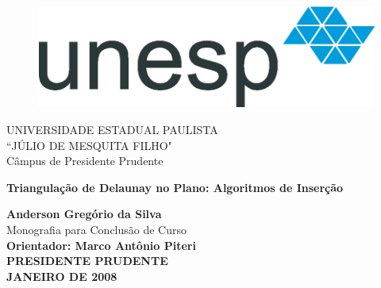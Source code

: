 \newpage

\thispagestyle{empty}

\begin{figure}[htbp]
  \leavevmode
  \includegraphics[scale = 0.4]{PaginasIniciais/unesplogo.eps}
\end{figure}

\hspace{15mm}
\vspace{23mm}
\begin{minipage}{155mm}
\vskip-30mm
\begin{center}
\Large UNIVERSIDADE ESTADUAL PAULISTA \\ ``J\'{U}LIO DE MESQUITA FILHO" \\[2mm]
\normalsize  C\^{a}mpus de Presidente Prudente 
\end{center}
\end{minipage}



\vspace{-15mm}

\begin{center}
\Large  {\bf Triangula\c{c}\~{a}o de Delaunay no Plano: Algoritmos de Inser\c{c}\~{a}o}
\end{center}
\vspace{10mm}
\begin{figure}[htbp]
  \begin{center}
    \leavevmode
 \end{center}
\end{figure}
\vspace{2mm}
\begin{center}
\large {\bf Anderson Greg\'orio da Silva}\\
\normalsize Monografia para Conclus\~{a}o de Curso \\[5mm]
\large {\bf Orientador: Marco Ant\^{o}nio Piteri }\\
\vspace{26mm}
\large \bf PRESIDENTE PRUDENTE \\ JANEIRO DE 2008
\end{center}


